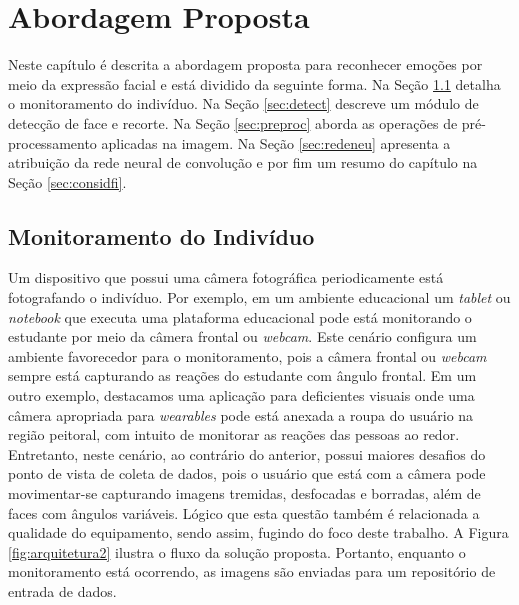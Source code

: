 \chapter{Abordagem Proposta}\label{sec:abordagemproposta}
Neste capítulo é descrita a abordagem proposta para reconhecer emoções por meio da expressão facial e está dividido da seguinte forma. Na Seção \ref{sec:monit} detalha o monitoramento do indivíduo. Na Seção \ref{sec:detect} descreve um módulo de detecção de face e recorte. Na Seção \ref{sec:preproc} aborda as operações de pré-processamento aplicadas na imagem. Na Seção \ref{sec:redeneu} apresenta a atribuição da rede neural de convolução e por fim um resumo do capítulo na Seção \ref{sec:considfi}.  

\section{Monitoramento do Indivíduo}\label{sec:monit}
Um dispositivo que possui uma câmera fotográfica periodicamente está fotografando o indivíduo. Por exemplo, em um ambiente educacional um \textit{tablet} ou \textit{notebook} que executa uma plataforma educacional pode está monitorando o estudante por meio da câmera frontal ou \textit{webcam}. Este cenário configura um ambiente favorecedor para o monitoramento, pois a câmera frontal ou \textit{webcam} sempre está capturando as reações do estudante com ângulo frontal. Em um outro exemplo, destacamos uma aplicação para deficientes visuais onde uma câmera apropriada para \textit{wearables} pode está anexada a roupa do usuário na região peitoral, com intuito de monitorar as reações das pessoas ao redor. Entretanto, neste cenário, ao contrário do anterior, possui maiores desafios do ponto de vista de coleta de dados, pois o usuário que está com a câmera pode movimentar-se capturando imagens tremidas, desfocadas e borradas, além de faces com ângulos variáveis. Lógico que esta questão também é relacionada a qualidade do equipamento, sendo assim, fugindo do foco deste trabalho. A Figura \ref{fig:arquitetura2} ilustra o fluxo da solução proposta. Portanto, enquanto o monitoramento está ocorrendo, as imagens são enviadas para um repositório de entrada de dados.


